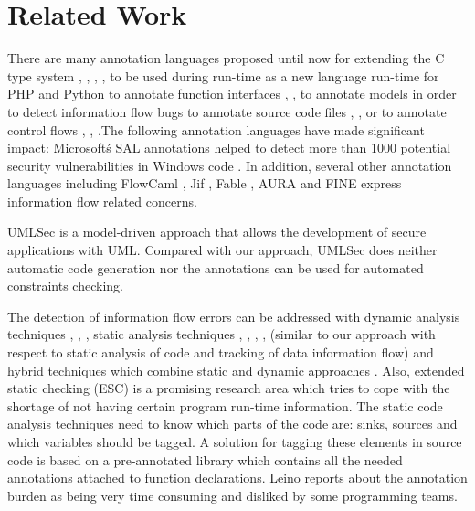 \chapter{Related Work}

There are many annotation languages proposed until now for
extending the C type system \cite{ref_54_condit:dependent}, \cite{ref_53_evans:static}, \cite{ref_51_microsoft:sal}, \cite{ref_55_sun:lock}, \cite{ref_56_torvalds:sparse} to be
used during run-time as a new language run-time for PHP and
Python \cite{ref_57_alex:improving} to annotate function interfaces \cite{ref_53_evans:static}, \cite{ref_51_microsoft:sal}, \cite{ref_56_torvalds:sparse} to
annotate models in order to detect information flow bugs \cite{ref_58_iflow:kuzman}
to annotate source code files \cite{ref_59_rosenblum:towards}, \cite{ref_60_rosenblum:practical}, \cite{ref_61_lintan:acomment} or to annotate
control flows \cite{ref_53_evans:static}, \cite{ref_52_splint:flow}, \cite{ref_51_microsoft:sal}.The following annotation languages have made significant impact: Microsoft\'s SAL annotations \cite{ref_51_microsoft:sal} helped to detect more than 1000 potential security vulnerabilities in Windows
code \cite{ref_50_ball:research}. In addition, several other annotation languages including FlowCaml \cite{ref_49_simonet:flowcaml}, Jif \cite{ref_48_chong:jif}, Fable \cite{ref_47_swamy:fable}, AURA \cite{ref_46_jia:aura} and FINE \cite{ref_45_nikhil:fine} express information flow related concerns.

UMLSec \cite{ref_33_juerjens:secure} is a model-driven approach that allows the
development of secure applications with UML. Compared with
our approach, UMLSec does neither automatic code
generation nor the annotations can be used for automated
constraints checking.

The detection of information flow errors can be
addressed with dynamic analysis techniques \cite{ref_44_avgerinos:aeg}, \cite{ref_43_fenton:memoryless}, \cite{ref_42_sabelfeld:dynamic},
static analysis techniques \cite{ref_41_guarnieri:security}, \cite{ref_40_myers:jflow}, \cite{ref_39_simonet:report}, \cite{ref_38_volpano:sound}, \cite{ref_37_xiao:transparent} (similar
to our approach with respect to static analysis of code and
tracking of data information flow) and hybrid techniques which
combine static and dynamic approaches \cite{ref_36_moore:static}. Also, extended
static checking \cite{ref_35_david:extended} (ESC) is a promising research area which
tries to cope with the shortage of not having certain program
run-time information.
The static code analysis techniques need to know which
parts of the code are: sinks, sources and which variables
should be tagged. A solution for tagging these elements in
source code is based on a pre-annotated library which contains
all the needed annotations attached to function declarations.
Leino \cite{ref_34_leino:10years} reports about the annotation burden as being very
time consuming and disliked by some programming teams.


